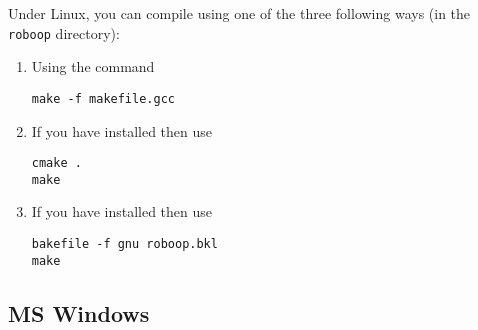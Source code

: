\documentclass[11pt,fleqn,letterpaper]{report}
\begin{document}
Under \textsf{Linux}, you can compile using one of the three following
ways (in the \texttt{roboop} directory):
\begin{enumerate}
\item Using the command 
\begin{verbatim}
make -f makefile.gcc
\end{verbatim}
\item If you have
   installed
  then use
\begin{verbatim}
cmake .
make
\end{verbatim}
\item If you have
  installed then use
\begin{verbatim}
bakefile -f gnu roboop.bkl
make
\end{verbatim}
\end{enumerate}

\subsection{MS Windows}
\end{document}
